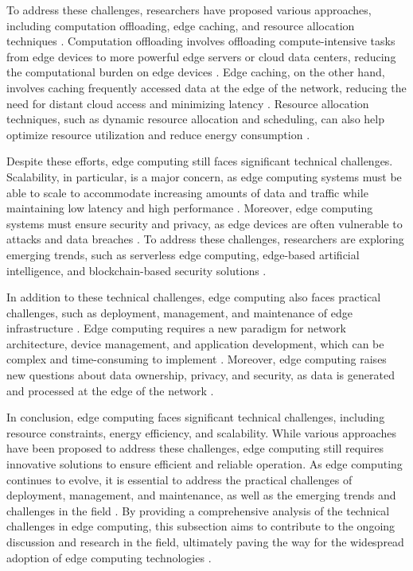 \documentclass[11pt,a4paper]{article}
\begin{document}
To address these challenges, researchers have proposed various approaches, including computation offloading, edge caching, and resource allocation techniques \cite{arxiv:1701.01090}. Computation offloading involves offloading compute-intensive tasks from edge devices to more powerful edge servers or cloud data centers, reducing the computational burden on edge devices \cite{arxiv:1703.10750}. Edge caching, on the other hand, involves caching frequently accessed data at the edge of the network, reducing the need for distant cloud access and minimizing latency \cite{arxiv:1810.13287}. Resource allocation techniques, such as dynamic resource allocation and scheduling, can also help optimize resource utilization and reduce energy consumption \cite{arxiv:1810.00305}.

Despite these efforts, edge computing still faces significant technical challenges. Scalability, in particular, is a major concern, as edge computing systems must be able to scale to accommodate increasing amounts of data and traffic while maintaining low latency and high performance \cite{arxiv:1808.05283}. Moreover, edge computing systems must ensure security and privacy, as edge devices are often vulnerable to attacks and data breaches \cite{arxiv:2206.07164}. To address these challenges, researchers are exploring emerging trends, such as serverless edge computing, edge-based artificial intelligence, and blockchain-based security solutions \cite{arxiv:2502.15775}.

In addition to these technical challenges, edge computing also faces practical challenges, such as deployment, management, and maintenance of edge infrastructure \cite{arxiv:2201.00242}. Edge computing requires a new paradigm for network architecture, device management, and application development, which can be complex and time-consuming to implement \cite{arxiv:2106.10063}. Moreover, edge computing raises new questions about data ownership, privacy, and security, as data is generated and processed at the edge of the network \cite{arxiv:2309.03420}.

In conclusion, edge computing faces significant technical challenges, including resource constraints, energy efficiency, and scalability. While various approaches have been proposed to address these challenges, edge computing still requires innovative solutions to ensure efficient and reliable operation. As edge computing continues to evolve, it is essential to address the practical challenges of deployment, management, and maintenance, as well as the emerging trends and challenges in the field \cite{arxiv:2305.01974}. By providing a comprehensive analysis of the technical challenges in edge computing, this subsection aims to contribute to the ongoing discussion and research in the field, ultimately paving the way for the widespread adoption of edge computing technologies \cite{arxiv:1911.02794}.
\end{document}
